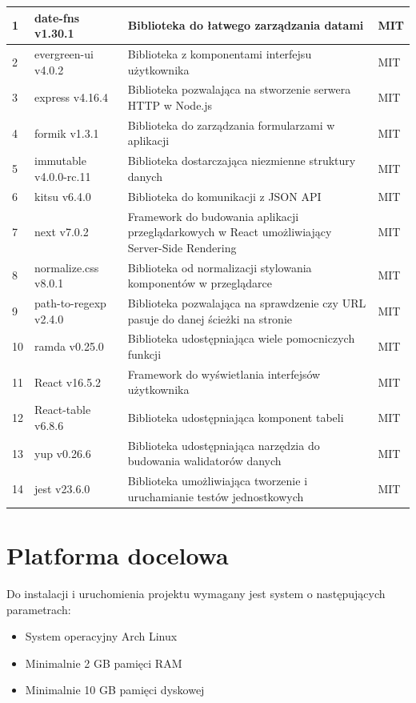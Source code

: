 \documentclass[a4paper,11pt,twoside]{report}
\theoremstyle{definition}
\begin{document}
\begin{longtable}{| p{} | p{} | p{} | p{} |}
            1 & date-fns v1.30.1 & Biblioteka do łatwego zarządzania datami & MIT \\ \hline
            2 & evergreen-ui v4.0.2 & Biblioteka z komponentami interfejsu użytkownika & MIT \\ \hline
            3 & express v4.16.4 & Biblioteka pozwalająca na stworzenie serwera HTTP w Node.js & MIT \\ \hline
            4 & formik v1.3.1 & Biblioteka do zarządzania formularzami w aplikacji & MIT \\ \hline
            5 & immutable v4.0.0-rc.11 & Biblioteka dostarczająca niezmienne struktury danych & MIT \\ \hline
            6 & kitsu v6.4.0 & Biblioteka do komunikacji z JSON API & MIT \\ \hline
            7 & next v7.0.2 & Framework do budowania aplikacji przeglądarkowych w React umożliwiający Server-Side Rendering & MIT \\ \hline
            8 & normalize.css v8.0.1 & Biblioteka od normalizacji stylowania komponentów w przeglądarce & MIT \\ \hline
            9 & path-to-regexp v2.4.0 & Biblioteka pozwalająca na sprawdzenie czy URL pasuje do danej ścieżki na stronie & MIT \\ \hline
            10 & ramda v0.25.0 & Biblioteka udostępniająca wiele pomocniczych funkcji & MIT \\ \hline
            11 & React v16.5.2 & Framework do wyświetlania interfejsów użytkownika & MIT \\ \hline
            12 & React-table v6.8.6 & Biblioteka udostępniająca komponent tabeli & MIT \\ \hline
            13 & yup v0.26.6 & Biblioteka udostępniająca narzędzia do budowania walidatorów danych & MIT \\ \hline
            14 & jest v23.6.0 & Biblioteka umożliwiająca tworzenie i uruchamianie testów jednostkowych & MIT \\ \hline
        \end{longtable}
    
    \section{Platforma docelowa}
        Do instalacji i uruchomienia projektu wymagany jest system o następujących parametrach:
        
        \begin{itemize}
            \item System operacyjny Arch Linux 
            \item Minimalnie 2 GB pamięci RAM
            \item Minimalnie 10 GB pamięci dyskowej
        \end{itemize}
        
\end{document}
